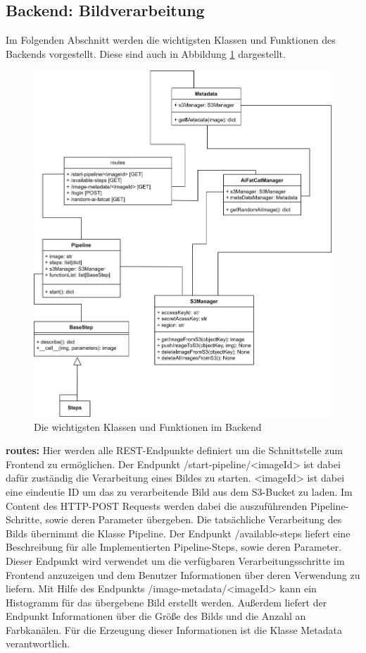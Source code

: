 \subsection{Backend: Bildverarbeitung}
Im Folgenden Abschnitt werden die wichtigsten Klassen und Funktionen des Backends vorgestellt. Diese sind auch in Abbildung \ref{fig:backend} dargestellt.
\FloatBarrier
\begin{figure}
    \centering
    \includegraphics[width=.7\textwidth]{Bilder/BackendBDCC.png}
    \caption{Die wichtigsten Klassen und Funktionen im Backend}
    \label{fig:backend}
\end{figure}
\textbf{routes:} Hier werden alle REST-Endpunkte definiert um die Schnittstelle zum Frontend zu ermöglichen. Der Endpunkt \glqq /start-pipeline/\textless imageId\textgreater \grqq{} ist dabei dafür zuständig die Verarbeitung eines Bildes zu starten. \glqq \textless imageId\textgreater  \grqq{} ist dabei eine eindeutie ID um das zu verarbeitende Bild aus dem S3-Bucket zu laden. Im Content des HTTP-POST Requests werden dabei die auszuführenden Pipeline-Schritte, sowie deren Parameter übergeben. Die tatsächliche Verarbeitung des Bilds übernimmt die Klasse \glqq Pipeline\grqq{}.
Der Endpunkt \glqq /available-steps\grqq{} liefert eine Beschreibung für alle Implementierten Pipeline-Steps, sowie deren Parameter. Dieser Endpunkt wird verwendet um die verfügbaren Verarbeitungsschritte im Frontend anzuzeigen und dem Benutzer Informationen über deren Verwendung zu liefern.
Mit Hilfe des Endpunkts \glqq /image-metadata/\textless imageId\textgreater \grqq{} kann ein Histogramm für das übergebene Bild erstellt werden. Außerdem liefert der Endpunkt Informationen über die Größe des Bilds und die Anzahl an Farbkanälen. Für die Erzeugung dieser Informationen ist die Klasse \glqq Metadata\grqq{} verantwortlich.
